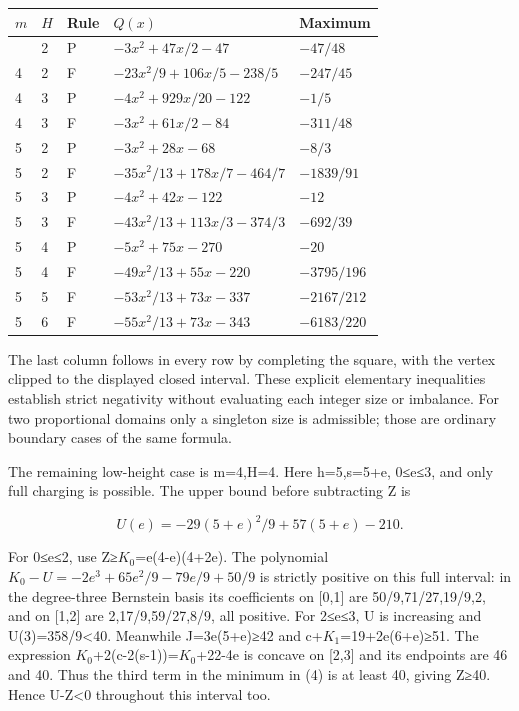 \documentclass[
  10pt,
  a4paper,
]{article}
\begin{document}
\begin{longtable}[]{@{}lllll@{}}
\toprule\noalign{}
\(m\) & \(H\) & Rule & \(Q(x)\) & Maximum \\
\midrule\noalign{}
\endhead
\bottomrule\noalign{}
\endlastfoot
4 & 2 & P & \(-3x^2+47x/2-47\) & \(-47/48\) \\
4 & 2 & F & \(-23x^2/9+106x/5-238/5\) & \(-247/45\) \\
4 & 3 & P & \(-4x^2+929x/20-122\) & \(-1/5\) \\
4 & 3 & F & \(-3x^2+61x/2-84\) & \(-311/48\) \\
5 & 2 & P & \(-3x^2+28x-68\) & \(-8/3\) \\
5 & 2 & F & \(-35x^2/13+178x/7-464/7\) & \(-1839/91\) \\
5 & 3 & P & \(-4x^2+42x-122\) & \(-12\) \\
5 & 3 & F & \(-43x^2/13+113x/3-374/3\) & \(-692/39\) \\
5 & 4 & P & \(-5x^2+75x-270\) & \(-20\) \\
5 & 4 & F & \(-49x^2/13+55x-220\) & \(-3795/196\) \\
5 & 5 & F & \(-53x^2/13+73x-337\) & \(-2167/212\) \\
5 & 6 & F & \(-55x^2/13+73x-343\) & \(-6183/220\) \\
\end{longtable}

The last column follows in every row by completing the square, with the
vertex clipped to the displayed closed interval. These explicit
elementary inequalities establish strict negativity without evaluating
each integer size or imbalance. For two proportional domains only a
singleton size is admissible; those are ordinary boundary cases of the
same formula.

The remaining low-height case is m=4,H=4. Here h=5,s=5+e, 0≤e≤3, and
only full charging is possible. The upper bound before subtracting Z is

\[U(e)=-29(5+e)^2/9+57(5+e)-210.\]

For 0≤e≤2, use Z≥\(K_0\)=e(4-e)(4+2e). The polynomial
\(K_0-U=-2e^3+65e^2/9-79e/9+50/9\) is strictly positive on this full
interval: in the degree-three Bernstein basis its coefficients on
{[}0,1{]} are 50/9,71/27,19/9,2, and on {[}1,2{]} are 2,17/9,59/27,8/9,
all positive. For 2≤e≤3, U is increasing and U(3)=358/9\textless40.
Meanwhile J=3e(5+e)≥42 and c+\(K_1\)=19+2e(6+e)≥51. The expression
\(K_0\)+2(c-2(s-1))=\(K_0\)+22-4e is concave on {[}2,3{]} and its
endpoints are 46 and 40. Thus the third term in the minimum in (4) is at
least 40, giving Z≥40. Hence U-Z\textless0 throughout this interval too.
\end{document}
